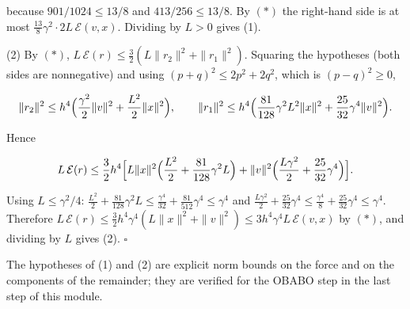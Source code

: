 \documentclass[11pt,a4paper]{article}
\begin{document}
because \(901/1024\le13/8\) and \(413/256\le13/8\). By \((\ast)\) the right-hand side is at most \(\frac{13}8\gamma^2\cdot2L\,\mathcal E(v,x)\). Dividing by \(L>0\) gives (1).




(2) By \((\ast)\), \(L\,\mathcal E(r)\le\frac32(L\|r_2\|^2+\|r_1\|^2)\). Squaring the hypotheses (both sides are nonnegative) and using \((p+q)^2\le2p^2+2q^2\), which is \((p-q)^2\ge0\),


\[\|r_2\|^2\le h^4\Bigl(\frac{\gamma^2}2\|v\|^2+\frac{L^2}2\|x\|^2\Bigr),\qquad\|r_1\|^2\le h^4\Bigl(\frac{81}{128}\gamma^2L^2\|x\|^2+\frac{25}{32}\gamma^4\|v\|^2\Bigr).\]


Hence


\[L\,\mathcal E(r)\le\frac32h^4\Bigl[L\|x\|^2\Bigl(\frac{L^2}2+\frac{81}{128}\gamma^2L\Bigr)+\|v\|^2\Bigl(\frac{L\gamma^2}2+\frac{25}{32}\gamma^4\Bigr)\Bigr].\]


Using \(L\le\gamma^2/4\): \(\frac{L^2}2+\frac{81}{128}\gamma^2L\le\frac{\gamma^4}{32}+\frac{81}{512}\gamma^4\le\gamma^4\) and \(\frac{L\gamma^2}2+\frac{25}{32}\gamma^4\le\frac{\gamma^4}8+\frac{25}{32}\gamma^4\le\gamma^4\). Therefore \(L\,\mathcal E(r)\le\frac32h^4\gamma^4(L\|x\|^2+\|v\|^2)\le3h^4\gamma^4L\,\mathcal E(v,x)\) by \((\ast)\), and dividing by \(L\) gives (2). \(\square\)




The hypotheses of (1) and (2) are explicit norm bounds on the force and on the components of the remainder; they are verified for the OBABO step in the last step of this module.
\end{document}
